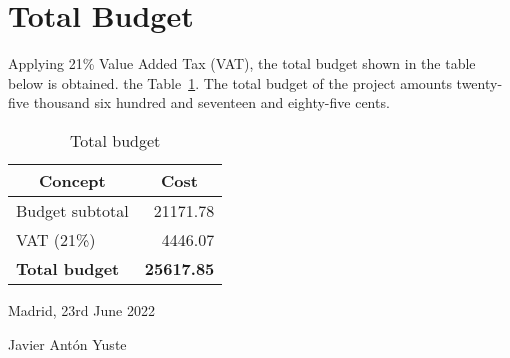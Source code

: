 \section*{Total Budget}
Applying 21\% Value Added Tax (VAT), the total budget shown in the table below is obtained. the Table~\ref{tab:total}. The total budget of the project amounts twenty-five thousand six hundred and seventeen and eighty-five cents.

\begin{table}[h]
\centering
\begin{tabular}{|l|r|}
\hline
\multicolumn{1}{|c|}{\textbf{Concept}} & \multicolumn{1}{c|}{\textbf{Cost}} \\ \hline
Budget subtotal                        & 21171.78                           \\ \hline
VAT (21\%)                             & 4446.07                            \\ \hline
\textbf{Total budget}                  & \textbf{25617.85}                  \\ \hline
\end{tabular}
\caption{Total budget}
\label{tab:total}
\end{table}

\begin{flushright}
  Madrid, 23rd June 2022\\
  \rule{0pt}{2cm}

  Javier Antón Yuste\\
\end{flushright}